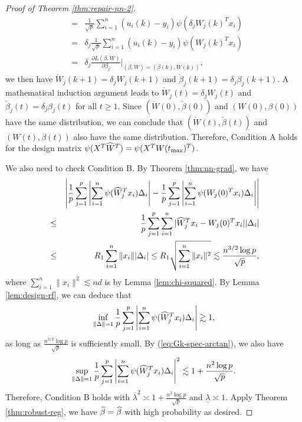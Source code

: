 \begin{proof}[Proof of Theorem \ref{thm:repair-nn-2}]
\begin{eqnarray*}
&=& \frac{1}{\sqrt{p}}\sum_{i=1}^n({u}_i(k)-y_i)\psi(\delta_j{W}_j(k)^Tx_i) \\
&=& \delta_j\frac{1}{\sqrt{p}}\sum_{i=1}^n({u}_i(k)-y_i)\psi({W}_j(k)^Tx_i) \\
&=& \delta_j\frac{\partial L(\beta,W)}{\partial \beta_j}|_{(\beta,W)=({\beta}(k),{W}(k))},
\end{eqnarray*}
we then have $\check{W}_j(k+1)=\delta_jW_j(k+1)$ and $\check{\beta}_j(k+1)=\delta_j\beta_j(k+1)$. A mathematical induction argument leads to $\check{W}_j(t)=\delta_jW_j(t)$ and $\check{\beta}_j(t)=\delta_j\beta_j(t)$ for all $t\geq 1$. Since $(\check{W}(0),\check{\beta}(0))$ and $(W(0),\beta(0))$ have the same distribution, we can conclude that $(\check{W}(t),\check{\beta}(t))$ and $(W(t),\beta(t))$ also have the same distribution. Therefore, Condition A holds for the design matrix $\psi(X^T\widehat{W}^T)=\psi(X^TW(t_{\max})^T)$.

We also need to check Condition B. By Theorem \ref{thm:nn-grad}, we have
\begin{eqnarray*}
&& \left|\frac{1}{p}\sum_{j=1}^p\left|\sum_{i=1}^n\psi(\wh{W}_j^Tx_i)\Delta_i\right| - \frac{1}{p}\sum_{j=1}^p\left|\sum_{i=1}^n\psi(W_j(0)^Tx_i)\Delta_i\right|\right| \\
&\leq& \frac{1}{p}\sum_{j=1}^p\sum_{i=1}^n|\wh{W}_j^Tx_i-W_j(0)^Tx_i||\Delta_i| \\
&\leq& R_1\sum_{i=1}^n\|x_i\||\Delta_i| \leq R_1\sqrt{\sum_{i=1}^n\|x_i\|^2} \lesssim \frac{n^{3/2}\log p}{\sqrt{p}},
\end{eqnarray*}
where $\sum_{i=1}^n\|x_i\|^2\lesssim nd$ is by Lemma \ref{lem:chi-squared}. By Lemma \ref{lem:design-rf}, we can deduce that
$$\inf_{\|\Delta\|=1}\frac{1}{p}\sum_{j=1}^p\left|\sum_{i=1}^n\psi(\widehat{W}_j^Tx_i)\Delta_i\right|\gtrsim 1,$$
as long as $\frac{n^{3/2}\log p}{\sqrt{p}}$ is sufficiently small. By (\ref{eq:Gk-spec-arctan}), we also have
$$\sup_{\|\Delta\|=1}\frac{1}{p}\sum_{j=1}^p\left|\sum_{i=1}^n\psi(\widehat{W}_j^Tx_i)\Delta_i\right|^2\lesssim 1+\frac{n^2\log p}{\sqrt{p}}.$$
Therefore, Condition B holds with $\overline{\lambda}^2\asymp 1+\frac{n^2\log p}{\sqrt{p}}$ and $\underline{\lambda}\asymp 1$. Apply Theorem \ref{thm:robust-reg}, we have $\widetilde{\beta}=\widehat{\beta}$ with high probability as desired.
\end{proof}
